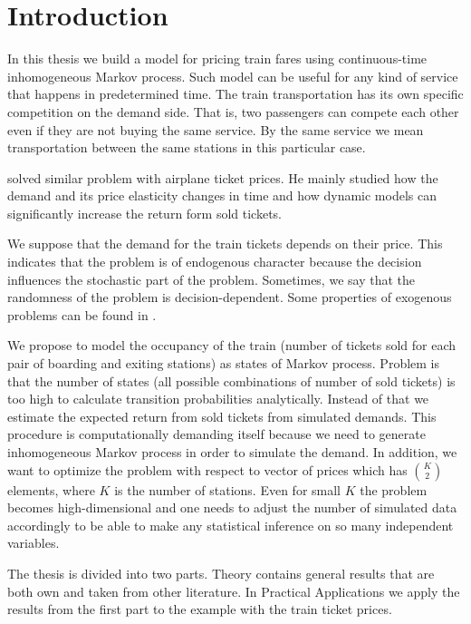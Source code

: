 \chapter*{Introduction}


In this thesis we build a model for pricing train fares using continuous-time inhomogeneous Markov process. Such model can be useful for any kind of service that happens in predetermined time. The train transportation has its own specific competition on the demand side. That is, two passengers can compete each other even if they are not buying the same service. By the same service we mean transportation between the same stations in this particular case.

\cite{Williams13} solved similar problem with airplane ticket prices. He mainly studied how the demand and its price elasticity changes in time and how dynamic models can significantly increase the return form sold tickets.

We suppose that the demand for the train tickets depends on their price. This indicates that the problem is of endogenous character because the decision influences the stochastic part of the problem. Sometimes, we say that the randomness of the problem is decision-dependent. Some properties of exogenous problems can be found in \cite{Dupacova06}.

We propose to model the occupancy of the train (number of tickets sold for each pair of boarding and exiting stations) as states of Markov process. Problem is that the number of states (all possible combinations of number of sold tickets) is too high to calculate transition probabilities analytically. Instead of that we estimate the expected return from sold tickets from simulated demands. This procedure is computationally demanding itself because we need to generate inhomogeneous Markov process in order to simulate the demand. In addition, we want to optimize the problem with respect to vector of prices which has $\binom{K}{2}$ elements, where $K$ is the number of stations. Even for small $K$ the problem becomes high-dimensional and one needs to adjust the number of simulated data accordingly to be able to make any statistical inference on so many independent variables.

The thesis is divided into two parts. Theory contains general results that are both own and taken from other literature. In Practical Applications we apply the results from the first part to the example with the train ticket prices.

